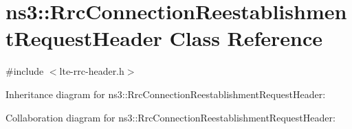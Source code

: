 \hypertarget{classns3_1_1RrcConnectionReestablishmentRequestHeader}{}\section{ns3\+:\+:Rrc\+Connection\+Reestablishment\+Request\+Header Class Reference}
\label{classns3_1_1RrcConnectionReestablishmentRequestHeader}


{\ttfamily \#include $<$lte-\/rrc-\/header.\+h$>$}



Inheritance diagram for ns3\+:\+:Rrc\+Connection\+Reestablishment\+Request\+Header\+:


Collaboration diagram for ns3\+:\+:Rrc\+Connection\+Reestablishment\+Request\+Header\+:
